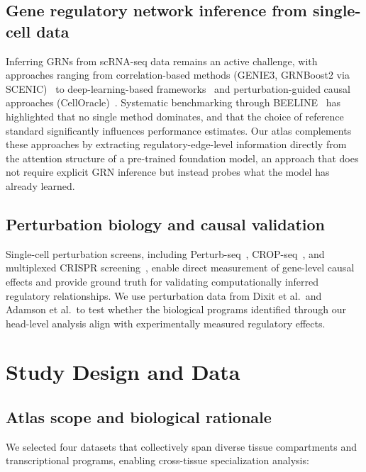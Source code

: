 \documentclass[11pt]{article}
\begin{document}
\subsection{Gene regulatory network inference from single-cell data}
Inferring GRNs from scRNA-seq data remains an active challenge, with approaches ranging from correlation-based methods (GENIE3, GRNBoost2 via SCENIC)~\cite{huynh2010genie3,aibar2017scenic} to deep-learning-based frameworks~\cite{eraslan2019dca} and perturbation-guided causal approaches (CellOracle)~\cite{kamimoto2023celloracle}. Systematic benchmarking through BEELINE~\cite{pratapa2020beeline} has highlighted that no single method dominates, and that the choice of reference standard significantly influences performance estimates. Our atlas complements these approaches by extracting regulatory-edge-level information directly from the attention structure of a pre-trained foundation model, an approach that does not require explicit GRN inference but instead probes what the model has already learned.

\subsection{Perturbation biology and causal validation}
Single-cell perturbation screens, including Perturb-seq~\cite{dixit2016perturb,replogle2022perturbseq}, CROP-seq~\cite{datlinger2017cropseq}, and multiplexed CRISPR screening~\cite{adamson2016multiplexed}, enable direct measurement of gene-level causal effects and provide ground truth for validating computationally inferred regulatory relationships. We use perturbation data from Dixit et al.\ and Adamson et al.\ to test whether the biological programs identified through our head-level analysis align with experimentally measured regulatory effects.


\section{Study Design and Data}

\subsection{Atlas scope and biological rationale}
We selected four datasets that collectively span diverse tissue compartments and transcriptional programs, enabling cross-tissue specialization analysis:
\end{document}
